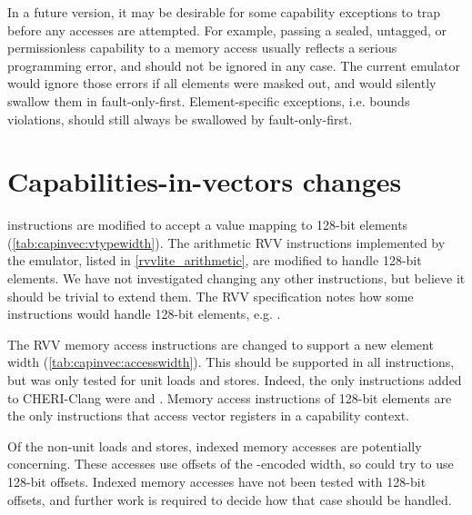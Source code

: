 In a future version, it may be desirable for some capability exceptions to trap before any accesses are attempted.
For example, passing a sealed, untagged, or permissionless capability to a memory access usually reflects a serious programming error, and should not be ignored in any case.
The current emulator would ignore those errors if all elements were masked out, and would silently swallow them in fault-only-first.
Element-specific exceptions, i.e. bounds violations, should still always be swallowed by fault-only-first.




\section{Capabilities-in-vectors changes}\label{appx:capinvec}
 instructions are modified to accept a  value mapping to 128-bit elements (\cref{tab:capinvec:vtypewidth}).
The arithmetic RVV instructions implemented by the emulator, listed in \cref{rvvlite_arithmetic}, are modified to handle 128-bit elements.
We have not investigated changing any other instructions, but believe it should be trivial to extend them.
The RVV specification notes how some instructions would handle 128-bit elements, e.g. \cite[Chapter 13]{specification-RVV-v1.0}.

The RVV memory access instructions are changed to support a new element width (\cref{tab:capinvec:accesswidth}).
This should be supported in all instructions, but was only tested for unit loads and stores.
Indeed, the only instructions added to CHERI-Clang were  and .
Memory access instructions of 128-bit elements are the only instructions that access vector registers in a capability context.

Of the non-unit loads and stores, indexed memory accesses are potentially concerning.
These accesses use offsets of the -encoded width, so could try to use 128-bit offsets.
Indexed memory accesses have not been tested with 128-bit offsets, and further work is required to decide how that case should be handled.

